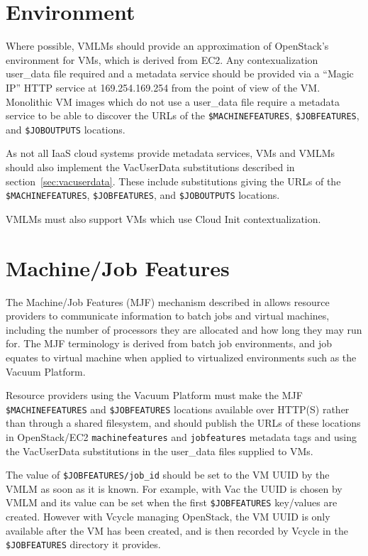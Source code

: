 \documentclass[12pt,a4paper]{article}
\begin{document}
\section{Environment}
\label{sec:env}

Where possible, VMLMs should provide an approximation of OpenStack's 
environment for VMs, which is derived from EC2. Any contexualization 
user\_data file required and a metadata service should be provided via a 
``Magic IP'' 
HTTP service at 169.254.169.254 from the point of view of the VM. 
Monolithic VM images which do not use a user\_data file require a 
metadata service to be able to discover the 
URLs of the \texttt{\$MACHINEFEATURES}, \texttt{\$JOBFEATURES}, and 
\texttt{\$JOBOUTPUTS} locations.

As not all IaaS cloud systems provide metadata services, VMs and VMLMs 
should also implement the VacUserData substitutions described 
in section~\ref{sec:vacuserdata}. These include substitutions giving the 
URLs of the \texttt{\$MACHINEFEATURES}, \texttt{\$JOBFEATURES}, and 
\texttt{\$JOBOUTPUTS} locations.

VMLMs must also support VMs which use Cloud Init contextualization.

\section{Machine/Job Features}
\label{sec:mjf}

The Machine/Job Features (MJF) mechanism described in \cite{HSFMJF} allows
resource providers to communicate information to batch jobs and virtual
machines, including the number of processors they are allocated and
how long they may run for. The MJF terminology is derived from batch
job environments, and job equates to virtual machine when applied to
virtualized environments such as the Vacuum Platform. 

Resource providers using the Vacuum Platform must make the MJF
\texttt{\$MACHINEFEATURES} and \texttt{\$JOBFEATURES} locations
available over HTTP(S) rather than through a shared filesystem, and
should publish the URLs of these locations in OpenStack/EC2 
\texttt{machinefeatures} and \texttt{jobfeatures} metadata 
tags and using the VacUserData substitutions in the user\_data files
supplied to VMs.

The value of \texttt{\$JOBFEATURES/job\_id} should be set to the VM UUID by
the VMLM as soon as it is known. For example, with Vac the UUID is
chosen by VMLM and its value can be set when the first
\texttt{\$JOBFEATURES}
key/values are created. However with Vcycle managing OpenStack, the
VM UUID is only available after the VM has been created, and is then
recorded by Vcycle in the \texttt{\$JOBFEATURES} directory it provides.
\end{document}
